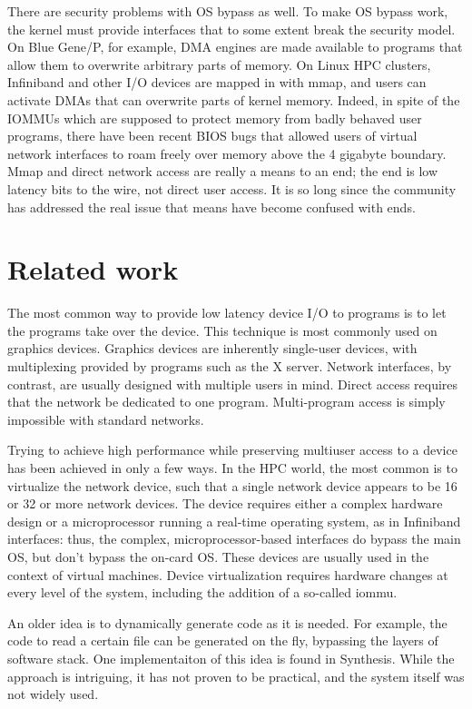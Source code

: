 \documentclass[letterpaper,twocolumn,10pt]{article}
\begin{document}
There are security problems with OS bypass as well. 
To make OS bypass work, the kernel must provide interfaces that to some extent break the security model. On Blue Gene/P, for 
example, DMA engines  are made available to programs  that allow them to overwrite arbitrary parts of memory. On Linux HPC clusters, 
Infiniband and other I/O devices are mapped in with mmap, and users can activate DMAs that can overwrite parts of kernel memory. Indeed, 
in spite of the IOMMUs which are supposed to protect memory from badly behaved user programs, 
there have been recent BIOS bugs that allowed users of virtual network interfaces to roam freely over memory above the 4 gigabyte
boundary\cite{iommubug}. Mmap and direct network access are  really  a 
means to an end; the end is low latency bits to the wire, not direct user access. It is so long 
since the community has addressed the real issue that means have become confused with ends. 

\section{Related work}
The most common way to provide low latency device I/O 
to programs is to let the programs take over the device. 
This technique is most commonly used on graphics devices. Graphics devices are inherently single-user devices, with multiplexing 
provided by programs such as the X server. Network interfaces, by contrast, are usually designed with multiple users in mind. 
Direct access requires that the network be dedicated to one program. Multi-program access is simply impossible with 
standard networks. 

Trying to achieve high performance while preserving multiuser access to a device 
has been achieved in only a few ways. In the HPC world, 
the most common is to virtualize the network device, such 
that a single network device appears to be 16 or 32 or more network devices. The device 
requires either a complex hardware design or a microprocessor running a real-time operating system, as in 
Infiniband interfaces: thus, the complex, microprocessor-based interfaces do bypass the main OS, 
but don't bypass the on-card OS\cite{Boden95myrinet}. 
These devices are usually 
used in the context of virtual machines. Device virtualization  requires hardware changes at every level of the system, including
the addition of a so-called iommu\cite{iommu}. 

An older idea is to dynamically generate code as it is needed. For example, the code to read a certain file can 
be generated on the fly, bypassing the layers of software stack. One implementaiton of this idea 
is found in   Synthesis\cite{synthesis}. While the approach is intriguing, 
it has not proven to be practical, and the system itself was not widely used. 
\end{document}
